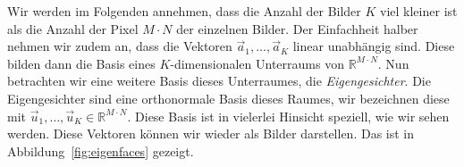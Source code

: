 Wir werden im Folgenden annehmen, dass die Anzahl der Bilder $K$ viel kleiner ist als die Anzahl der Pixel $M\cdot N$ der einzelnen Bilder.
Der Einfachheit halber nehmen wir zudem an, dass die Vektoren $\vec a_1,\ldots,\vec a_K$ linear unabhängig sind.
Diese bilden dann die Basis eines $K$-dimensionalen Unterraums von $\mathbb R^{M\cdot N}$.
Nun betrachten wir eine weitere Basis dieses Unterraumes, die \textit{Eigengesichter}.
Die Eigengesichter sind eine orthonormale Basis dieses Raumes, wir bezeichnen diese mit $\vec u_1,\dots,\vec u_K\in\mathbb R^{M\cdot N}$.
Diese Basis ist in vielerlei Hinsicht speziell, wie wir sehen werden.
Diese Vektoren können wir wieder als Bilder darstellen.
Das ist in Abbildung~\ref{fig:eigenfaces} gezeigt.
